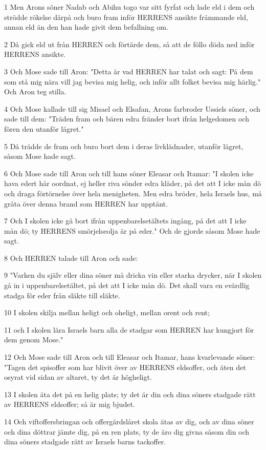 \par 1 Men Arons söner Nadab och Abihu togo var sitt fyrfat och lade eld i dem och strödde rökelse därpå och buro fram inför HERRENS ansikte främmande eld, annan eld än den han hade givit dem befallning om.
\par 2 Då gick eld ut från HERREN och förtärde dem, så att de föllo döda ned inför HERRENS ansikte.
\par 3 Och Mose sade till Aron: "Detta är vad HERREN har talat och sagt: På dem som stå mig nära vill jag bevisa mig helig, och inför allt folket bevisa mig härlig." Och Aron teg stilla.
\par 4 Och Mose kallade till sig Misael och Elsafan, Arons farbroder Ussiels söner, och sade till dem: "Träden fram och bären edra fränder bort ifrån helgedomen och fören den utanför lägret."
\par 5 Då trädde de fram och buro bort dem i deras livklädnader, utanför lägret, såsom Mose hade sagt.
\par 6 Och Mose sade till Aron och till hans söner Eleasar och Itamar: "I skolen icke hava edert hår oordnat, ej heller riva sönder edra kläder, på det att I icke mån dö och draga förtörnelse över hela menigheten. Men edra bröder, hela Israels hus, må gråta över denna brand som HERREN har upptänt.
\par 7 Och I skolen icke gå bort ifrån uppenbarelsetältets ingång, på det att I icke mån dö; ty HERRENS smörjelseolja är på eder." Och de gjorde såsom Mose hade sagt.
\par 8 Och HERREN talade till Aron och sade:
\par 9 "Varken du själv eller dina söner må dricka vin eller starka drycker, när I skolen gå in i uppenbarelsetältet, på det att I icke mån dö. Det skall vara en evärdlig stadga för eder från släkte till släkte.
\par 10 I skolen skilja mellan heligt och oheligt, mellan orent och rent;
\par 11 och I skolen lära Israels barn alla de stadgar som HERREN har kungjort för dem genom Mose."
\par 12 Och Mose sade till Aron och till Eleasar och Itamar, hans kvarlevande söner: "Tagen det spisoffer som har blivit över av HERRENS eldsoffer, och äten det osyrat vid sidan av altaret, ty det är högheligt.
\par 13 I skolen äta det på en helig plats; ty det är din och dina söners stadgade rätt av HERRENS eldsoffer; så är mig bjudet.
\par 14 Och viftoffersbringan och offergärdslåret skola ätas av dig, och av dina söner och dina döttrar jämte dig, på en ren plats, ty de äro dig givna såsom din och dina söners stadgade rätt av Israels barns tackoffer.

